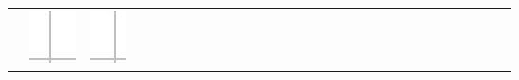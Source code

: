 \documentclass[10pt]{article}
\begin{document}
\begin{center}
\begin{tabular}{|c|c|c|c|c|c|c|c|c|c|c|c|c|c|c|c|c|c|c|c|c|c|c|c|c|c|c|c|c|c|}
 & \includegraphics[max width=\textwidth]{2024_11_21_6438f6dbc3784fe6d1deg-08(6)}
 & \includegraphics[max width=\textwidth]{2024_11_21_6438f6dbc3784fe6d1deg-08(2)}

\end{tabular}
\end{center}
\end{document}
